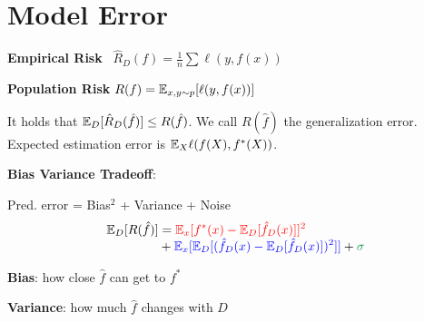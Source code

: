 \section*{Model Error }

\textbf{Empirical Risk} \quad \ $\hat R_D(f) = \frac{1}{n} \sum \mathcal \ell(y, f(x))$

\textbf{Population Risk} \quad $R(f) = \mathbb{E}_{x,y \sim p}[\ell(y, f(x))]$

It holds that $\mathbb{E}_D[\hat R_D (\hat f)] \leq R(\hat f)$. We call $R(\hat f)$ the generalization error. Expected estimation error is $\mathbb{E}_{X}\ell(f(X), f^\ast(X))$.

\textbf{Bias Variance Tradeoff}:

Pred. error = \color{red} Bias$^2$ \color{black} + \color{blue} Variance \color{black} + \color{ForestGreen} Noise \color{black}
\begin{align*}
	\E_D[R(\hat f)] &= \color{red} \E_x[f^*(x) - \E_D[\hat f_D(x)]]^2 \\[-4pt]
 	&+ \color{blue} \E_x[\E_D[(\hat f_D(x) - \E_D[\hat f_D(x)])^2]] \color{black}  + \color{ForestGreen} \sigma
\end{align*}

\textbf{Bias}: how close $\hat f$ can get to $f^*$

\textbf{Variance}: how much $\hat f$ changes with $D$
